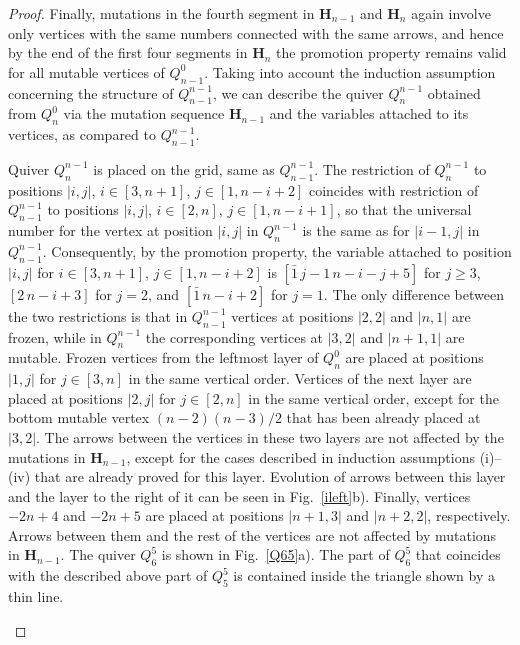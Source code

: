 \documentclass[10pt,a4paper]{amsart}
\def\Hs{\mathbf H}
\begin{document}
\begin{proof}
Finally, mutations in the fourth segment in $\Hs_{n-1}$ and $\Hs_n$ again involve only vertices with the same numbers connected with the same arrows, and hence by the end of the first four segments in $\Hs_n$ the promotion property remains valid for all mutable vertices of $Q_{n-1}^0$. Taking into account the induction assumption concerning the 
structure of $Q_{n-1}^{n-1}$, we can describe the quiver $Q_n^{n-1}$ obtained from $Q_n^0$ via the mutation sequence 
$\Hs_{n-1}$ and the variables attached to its vertices, as compared to $Q_{n-1}^{n-1}$. 

Quiver $Q_n^{n-1}$ is placed on the grid, same as $Q_{n-1}^{n-1}$. The restriction of $Q_n^{n-1}$ to positions $|i,j|$, 
$i\in[3,n+1]$, $j\in[1,n-i+2]$ coincides with restriction of $Q_{n-1}^{n-1}$ to positions $|i,j|$, $i\in[2,n]$, $j\in[1,n-i+1]$, so that the universal number for the vertex at position $|i,j|$ in $Q_n^{n-1}$ is the same as for $|i-1,j|$ in $Q_{n-1}^{n-1}$. Consequently, by the promotion property, the variable attached to position $|i,j|$ for $i\in[3,n+1]$, 
$j\in[1,n-i+2]$ is $[\bar1\, j-1\, n-i-j+5]$ for $j\ge 3$, $[2\, n-i+3]$ for $j=2$, and $[\bar1\, n-i+2]$ 
for $j=1$. The only difference between the two restrictions is that  in $Q_{n-1}^{n-1}$ vertices at positions $|2,2|$ and $|n,1|$ are frozen, while in $Q_n^{n-1}$ the corresponding vertices at $|3,2|$ and $|n+1,1|$ are mutable. Frozen vertices from the leftmost layer of $Q_n^0$ are placed at positions $|1,j|$ for $j\in[3,n]$ in the same vertical order. Vertices of the next layer are placed at positions $|2,j|$ for $j\in[2,n]$ in the same vertical order, except for the bottom mutable vertex $(n-2)(n-3)/2$ that has been already placed at $|3,2|$. The arrows between the vertices in these two layers are not affected by the mutations in $\Hs_{n-1}$, except for the cases described in induction assumptions 
(i)--(iv) that are already proved for this layer. Evolution of arrows between this layer and the layer to the right of it can be seen in Fig.~\ref{ileft}b). Finally, vertices $-2n+4$ and $-2n+5$ are placed at positions $|n+1,3|$ and $|n+2,2|$, respectively. Arrows between them and the rest of the vertices are not affected by mutations in $\Hs_{n-1}$. The quiver $Q_6^5$ is shown in Fig.~\ref{Q65}a). The part of $Q_6^5$ that coincides with the described above part of $Q_5^5$ is contained inside the triangle shown by a thin line.


\begin{figure}[ht]
\begin{center}


\end{center}
\end{figure}
\end{proof}
\end{document}
